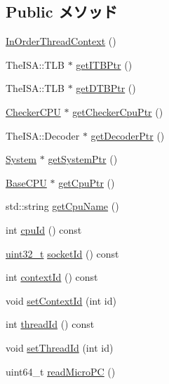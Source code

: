 \subsection*{Public メソッド}
\begin{DoxyCompactItemize}
\item 
\hyperlink{classInOrderThreadContext_af0f21865a9c4fc558cf601f02846f8da}{InOrderThreadContext} ()
\item 
TheISA::TLB $\ast$ \hyperlink{classInOrderThreadContext_a95b7e95d0558cd03d69613142fff9137}{getITBPtr} ()
\item 
TheISA::TLB $\ast$ \hyperlink{classInOrderThreadContext_a2fe6a07c44bc2a4d83b86bea605ba971}{getDTBPtr} ()
\item 
\hyperlink{classCheckerCPU}{CheckerCPU} $\ast$ \hyperlink{classInOrderThreadContext_a0807ebbe39e158fdf6007ca00e3f7252}{getCheckerCpuPtr} ()
\item 
TheISA::Decoder $\ast$ \hyperlink{classInOrderThreadContext_a6ae33963bc5f8b515f0a50c483f21c7f}{getDecoderPtr} ()
\item 
\hyperlink{classSystem}{System} $\ast$ \hyperlink{classInOrderThreadContext_af7bdb56e0088b380302741ad9008f321}{getSystemPtr} ()
\item 
\hyperlink{classBaseCPU}{BaseCPU} $\ast$ \hyperlink{classInOrderThreadContext_a4f35ce7d5cb2ec57504bc2c2bc03c879}{getCpuPtr} ()
\item 
std::string \hyperlink{classInOrderThreadContext_a096dc0eb4fc10d75220e3a101256340b}{getCpuName} ()
\item 
int \hyperlink{classInOrderThreadContext_a1e2d18ebf4e21f2416c21a8b072e2c7b}{cpuId} () const 
\item 
\hyperlink{Type_8hh_a435d1572bf3f880d55459d9805097f62}{uint32\_\-t} \hyperlink{classInOrderThreadContext_a1ff97b43199001357718671a4d922d12}{socketId} () const 
\item 
int \hyperlink{classInOrderThreadContext_a651d5d14e7a4e95ebe6d7f5b8ee5a107}{contextId} () const 
\item 
void \hyperlink{classInOrderThreadContext_a0dd10037a5b0eadaddfe7c67d52d3ac6}{setContextId} (int id)
\item 
int \hyperlink{classInOrderThreadContext_afc38d04c77e7b5fc3bbb0dd00fc87742}{threadId} () const 
\item 
void \hyperlink{classInOrderThreadContext_a9186b553811fbde99263b3fd831f1b0c}{setThreadId} (int id)
\item 
uint64\_\-t \hyperlink{classInOrderThreadContext_ae2413b39c462b20a91b585723e44e7f1}{readMicroPC} ()

\end{DoxyCompactItemize}
